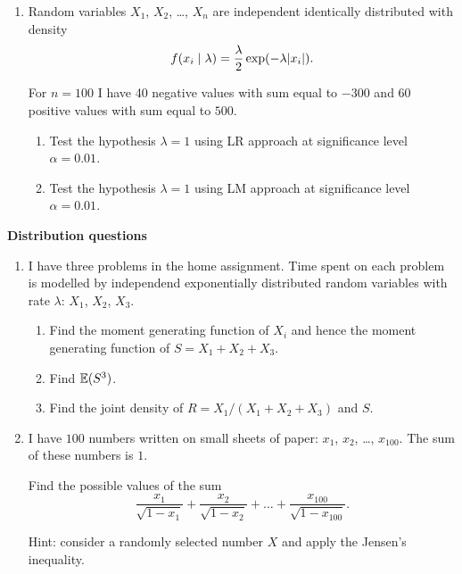 \begin{enumerate}
    \item Random variables $X_1$, $X_2$, \ldots,  $X_n$ are independent identically distributed with density 
    \[
    f(x_i \mid \lambda) = \frac{\lambda}{2} \exp(-\lambda \abs{x_i}).    
    \]

    For $n=100$ I have 40 negative values with sum equal to $-300$ and 60 positive values with sum equal to $500$. 

    \begin{enumerate}
        \item Test the hypothesis $\lambda = 1$ using LR approach at significance level $\alpha=0.01$.
        \item Test the hypothesis $\lambda = 1$ using LM approach at significance level $\alpha=0.01$.
    \end{enumerate}


\end{enumerate}

    \textbf{Distribution questions}

    \begin{enumerate}[resume]
    \item I have three problems in the home assignment. 
    Time spent on each problem is modelled by independend exponentially distributed random variables with rate $\lambda$: $X_1$, $X_2$, $X_3$.

    \begin{enumerate}
        \item Find the moment generating function of $X_i$ and hence the moment generating function of $S = X_1 + X_2 + X_3$.
        \item Find $\operatorname{\mathbb{E}}(S^3)$.
        \item Find the joint density of $R = X_1 / (X_1 + X_2 + X_3)$ and $S$.
    \end{enumerate}

    \item I have $100$ numbers written on small sheets of paper: $x_1$, $x_2$, \ldots, $x_{100}$. The sum of these numbers is $1$. 
    
    Find the possible values of the sum 
    \[
    \frac{x_1}{\sqrt{1-x_1}} +     \frac{x_2}{\sqrt{1-x_2}} + \ldots + \frac{x_{100}}{\sqrt{1-x_{100}}}.
    \]
    

    Hint: consider a randomly selected number $X$ and apply the Jensen's inequality.
    
 
\end{enumerate}
